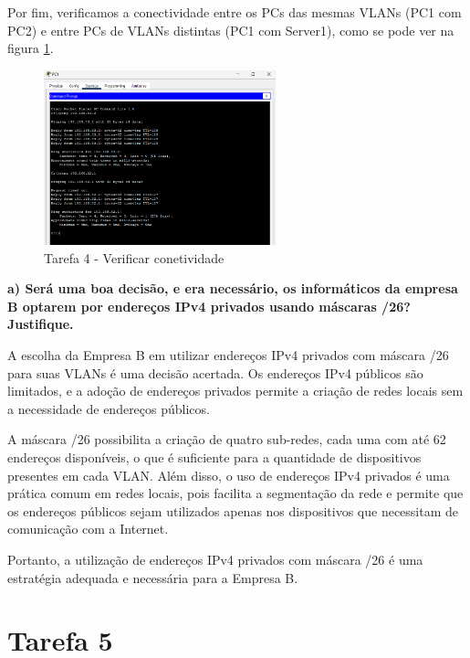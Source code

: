 \documentclass[11pt,english, openright, oneside]{book}
\begin{document}
Por fim, verificamos a conectividade entre os PCs das mesmas VLANs (PC1 com PC2)
e entre PCs de VLANs distintas (PC1 com Server1), como se pode ver na figura
\ref{fig:4.1.7}.

\begin{figure}[H]
    \centering
    \includegraphics[width=0.6\textwidth]{imagens/Tarefa4/4.1.7.png}
    \caption{Tarefa 4 - Verificar conetividade}
    \label{fig:4.1.7}
\end{figure}

\vspace{0.8cm}

\textbf{a) Será uma boa decisão, e era necessário, os informáticos da empresa B optarem por endereços IPv4 privados usando máscaras /26? Justifique.}
\vspace{0.2cm}

A escolha da Empresa B em utilizar endereços IPv4 privados com máscara /26 para
suas VLANs é uma decisão acertada. Os endereços IPv4 públicos são limitados, e a
adoção de endereços privados permite a criação de redes locais sem a necessidade
de endereços públicos.

A máscara /26 possibilita a criação de quatro sub-redes, cada uma com até 62
endereços disponíveis, o que é suficiente para a quantidade de dispositivos
presentes em cada VLAN. Além disso, o uso de endereços IPv4 privados é uma
prática comum em redes locais, pois facilita a segmentação da rede e permite que
os endereços públicos sejam utilizados apenas nos dispositivos que necessitam de
comunicação com a Internet.

Portanto, a utilização de endereços IPv4 privados com máscara /26 é uma
estratégia adequada e necessária para a Empresa B.

\pagebreak

\section{Tarefa 5}
\vspace{0.2cm}
\end{document}
